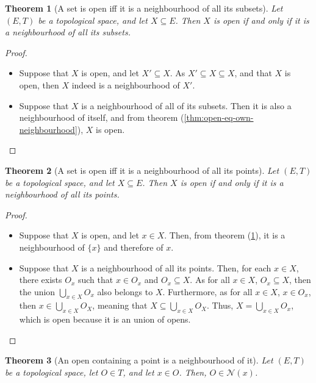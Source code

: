 \documentclass{article}
\newtheorem{theorem}{Theorem}[section]
\theoremstyle{definition}
\theoremstyle{remark}
\theoremstyle{example}
\theoremstyle{notation}
\begin{document}
\begin{theorem}[A set is open iff it is a neighbourhood of all its subsets] \label{thm:open-eq-neighbourhood}
		Let $(E, T)$ be a topological space, and let $X \subseteq E$. Then $X$ is open if and only if it is a neighbourhood of all its subsets.
\end{theorem}

\begin{proof}~
	\begin{itemize}
		\item Suppose that $X$ is open, and let $X' \subseteq X$. As $X' \subseteq X \subseteq X$, and that $X$ is open, then $X$ indeed is a neighbourhood of $X'$.
		\item Suppose that $X$ is a neighbourhood of all of its subsets. Then it is also a neighbourhood of itself, and from theorem (\ref{thm:open-eq-own-neighbourhood}), $X$ is open.
	\end{itemize}
\end{proof}

\begin{theorem}[A set is open iff it is a neighbourhood of all its points] \label{thm:open-eq-point}
		Let $(E, T)$ be a topological space, and let $X \subseteq E$. Then $X$ is open if and only if it is a neighbourhood of all its points.
\end{theorem}

\begin{proof}~
		\begin{itemize}
				\item Suppose that $X$ is open, and let $x \in X$. Then, from theorem (\ref{thm:open-eq-neighbourhood}), it is a neighbourhood of $\{x\}$ and therefore of $x$.
				\item Suppose that $X$ is a neighbourhood of all its points. Then, for each $x \in X$, there exists $O_x$ such that $x \in O_x$ and $O_x \subseteq X$. As for all $x \in X$, $O_x \subseteq X$, then the union $\bigcup_{x \in X} O_x$ also belongs to $X$. Furthermore, as for all $x \in X$, $x \in O_x$, then $x \in \bigcup_{x \in X} O_X$, meaning that $X \subseteq \bigcup_{x \in X} O_X$. Thus, $X = \bigcup_{x \in X} O_x$, which is open because it is an union of opens.
		\end{itemize}
\end{proof}

\begin{theorem}[An open containing a point is a neighbourhood of it] \label{thm:open-contain-point}
		Let $(E, T)$ be a topological space, let $O \in T$, and let $x \in O$. Then, $O \in \mathcal{N}(x)$.
\end{theorem}
\end{document}

